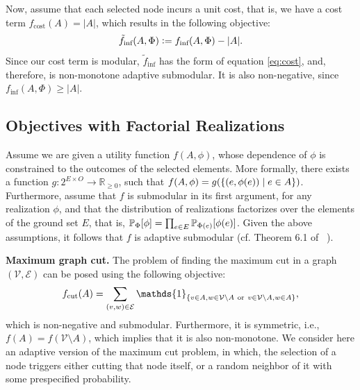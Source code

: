 \documentclass{article}
\newcommand{\defeq}{\vcentcolon=}
\let\originalleft\left
\let\originalright\right
\renewcommand{\left}{\mathopen{}\mathclose\bgroup\originalleft}
\renewcommand{\right}{\aftergroup\egroup\originalright}
\newcommand{\citet}[1]{\citeauthor{#1}~\shortcite{#1}}
\renewcommand{\paragraph}[1]{\vspace{0.3em}\noindent\textbf{#1.}\makebox[0.5em]{}}
\begin{document}
Now, assume that each selected node incurs a unit cost, that is, we have a cost term $f_{\textrm{cost}}(A) = |A|$, which results in the following objective:
\begin{align*}
  \tilde{f}_{\textrm{inf}}(A, \Phi) \defeq f_{\textrm{inf}}(A, \Phi) - |A|.
\end{align*}
Since our cost term is modular, $\tilde{f}_{\textrm{inf}}$ has the form of equation \eqref{eq:cost}, and, therefore, is non-monotone adaptive submodular.
It is also non-negative, since $f_{\textrm{inf}}(A, \Phi) \geq |A|$.

\subsection{Objectives with Factorial Realizations}
Assume we are given a utility function $f(A, \phi)$, whose dependence of $\phi$ is constrained to the outcomes of the selected elements.
More formally, there exists a function $g : 2^{E \times O} \to \mathbb{R}_{\geq 0}$, such that $f(A, \phi) = g\left(\{(e, \phi(e)) \mid e \in A\}\right)$.
Furthermore, assume that $f$ is submodular in its first argument, for any realization $\phi$, and that the distribution of realizations factorizes over the elements of the ground set $E$, that is, $\P[\Phi]{\phi} = \prod_{e \in E}\P[\Phi(e)]{\phi(e)}$.
Given the above assumptions, it follows that $f$ is adaptive submodular (cf. Theorem 6.1 of \citet{golovin11}).

\paragraph{Maximum graph cut}
The problem of finding the maximum cut in a graph $(\mathcal{V}, \mathcal{E})$ can be posed using the following objective:
\begin{align*}
  f_{\textrm{cut}}(A) = \sum_{(v, w) \in \mathcal{E}} \mathds{1}_{\left\{v \in A, w \in \mathcal{V}\setminus A\ \textrm{or}\ v \in \mathcal{V}\setminus A, w \in A\right\}},
\end{align*}
which is non-negative and submodular.
Furthermore, it is symmetric, i.e., $f(A) = f(\mathcal{V}\setminus A)$, which implies that it is also non-monotone.
We consider here an adaptive version of the maximum cut problem, in which, the selection of a node triggers either cutting that node itself, or a random neighbor of it with some prespecified probability.
\end{document}
